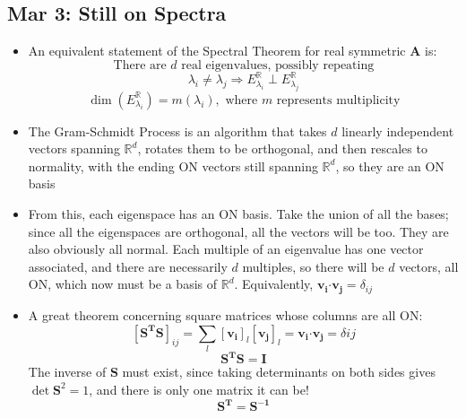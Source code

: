 \documentclass[10pt, oneside]{article}
\newcommand{\R}{\mathbb{R}}
\newcommand{\Cdot}{\boldsymbol{\cdot}}
\renewcommand{\vec}[1]{\mathbf{#1}}
\newcommand{\mat}[1]{\mathbf{#1}}
\begin{document}
\subsection{Mar 3: Still on Spectra}
\begin{itemize}
    \item An equivalent statement of the Spectral Theorem for real symmetric $\mat{A}$ is:
        \[\text{There are $d$ real eigenvalues, possibly repeating}\]
        \[\lambda_i \neq \lambda_j \Rightarrow E_{\lambda_i}^\R \perp E_{\lambda_j}^\R\]
        \[\dim (E_{\lambda_i}^\R) = m(\lambda_i), \text{ where $m$ represents multiplicity}\]
    \item The Gram-Schmidt Process is an algorithm that takes $d$ linearly independent vectors spanning $\R^d$, rotates them to be orthogonal, and then rescales to normality, with the ending ON vectors still spanning $\R^d$, so they are an ON basis
    \item From this, each eigenspace has an ON basis. Take the union of all the bases; since all the eigenspaces are orthogonal, all the vectors will be too. They are also obviously all normal. Each multiple of an eigenvalue has one vector associated, and there are necessarily $d$ multiples, so there will be $d$ vectors, all ON, which now must be a basis of $\R^d$. Equivalently, $\vec{v_i} \Cdot \vec{v_j} = \delta_{ij}$
    \item A great theorem concerning square matrices whose columns are all ON:
        \[[\mat{S^T}\mat{S}]_{ij} = \sum_{l} [\vec{v_i}]_l[\vec{v_j}]_l = \vec{v_i} \Cdot \vec{v_j} = \delta{ij}\]
        \[\mat{S^T}\mat{S} = \mat{I}\]
        The inverse of $\mat{S}$ must exist, since taking determinants on both sides gives $\det \mat{S}^2 = 1$, and there is only one matrix it can be!
        \[\mat{S^T} = \mat{S^{-1}}\]
\end{itemize}
\end{document}

